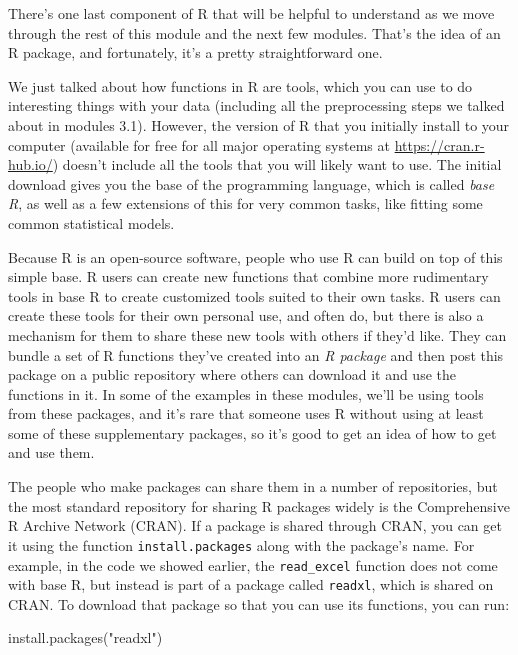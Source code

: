 \documentclass[]{tufte-book}
\newenvironment{Shaded}{}{}
\newcommand{\FunctionTok}[1]{\textcolor[rgb]{0.02,0.16,0.49}{#1}}
\newcommand{\NormalTok}[1]{#1}
\newcommand{\StringTok}[1]{\textcolor[rgb]{0.25,0.44,0.63}{#1}}
\begin{document}
There's one last component of R that will be helpful to understand as we move through
the rest of this module and the next few modules. That's the idea of an R package, and
fortunately, it's a pretty straightforward one.

We just talked about how functions in R are tools, which you can use to do interesting
things with your data (including all the preprocessing steps we talked about in
modules 3.1). However, the version of R that you initially install to your computer
(available for free for all major operating systems at \url{https://cran.r-hub.io/}) doesn't
include all the tools that you will likely want to use. The initial download gives you
the base of the programming language, which is called \emph{base R}, as well as a few
extensions of this for very common tasks, like fitting some common statistical models.

Because R is an open-source software, people who use R can build on top of this
simple base. R users can create new functions that combine more rudimentary
tools in base R to create customized tools suited to their own tasks. R users
can create these tools for their own personal use, and often do, but there is
also a mechanism for them to share these new tools with others if they'd like.
They can bundle a set of R functions they've created into an \emph{R package} and
then post this package on a public repository where others can download it and
use the functions in it. In some of the examples in these modules, we'll be
using tools from these packages, and it's rare that someone uses R without using
at least some of these supplementary packages, so it's good to get an idea of
how to get and use them.

The people who make packages can share them in a number of repositories, but the
most standard repository for sharing R packages widely is the Comprehensive R
Archive Network (CRAN). If a package is shared through CRAN, you can get it
using the function \texttt{install.packages} along with the package's name. For
example, in the code we showed earlier, the \texttt{read\_excel} function does not come
with base R, but instead is part of a package called \texttt{readxl}, which is shared
on CRAN. To download that package so that you can use its functions, you can
run:

\begin{Shaded}
\begin{Highlighting}[]
\FunctionTok{install.packages}\NormalTok{(}\StringTok{"readxl"}\NormalTok{)}
\end{Highlighting}
\end{Shaded}
\end{document}
